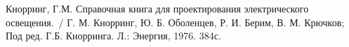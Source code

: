 ﻿\begin{thebibliography}{100}

Кнорринг, Г.М. Справочная книга для проектирования электрического освещения.~/
Г. М. Кнорринг, Ю. Б. Оболенцев, Р. И. Берим, В. М. Крючков; Под ред. Г.Б. Кнорринга. Л.: Энергия, 1976. 384с.

\end{thebibliography}
